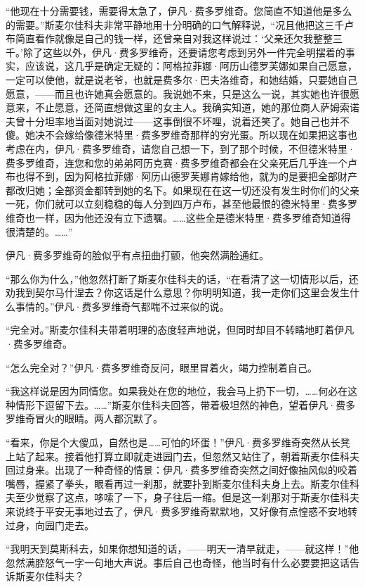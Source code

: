 \par “他现在十分需要钱，需要得太急了，伊凡·费多罗维奇。您简直不知道他是多么的需要。”斯麦尔佳科夫非常平静地用十分明确的口气解释说，“况且他把这三千卢布简直看作就像是自己的钱一样，还曾亲自对我这样说过：‘父亲还欠我整整三千。’除了这些以外，伊凡·费多罗维奇，还要请您考虑到另外一件完全明摆着的事实，应该说，这几乎是确定无疑的：阿格拉菲娜·阿历山德罗芙娜如果自己愿意，一定可以使他，就是说老爷，也就是费多尔·巴夫洛维奇，和她结婚，只要她自己愿意，——而且也许她真会愿意的。我说她不来，只是这么一说，其实她也许很愿意来，不止愿意，还简直想做这里的女主人。我确实知道，她的那位商人萨姆索诺夫曾十分坦率地当面对她说过——这事倒很不坏哩，说着还笑了。她自己也并不傻。她决不会嫁给像德米特里·费多罗维奇那样的穷光蛋。所以现在如果把这事也考虑在内，伊凡·费多罗维奇，请您自己想一下，到了那个时候，不但德米特里·费多罗维奇，连您和您的弟弟阿历克赛·费多罗维奇都会在父亲死后几乎连一个卢布也得不到，因为阿格拉菲娜·阿历山德罗芙娜肯嫁给他，就为的是要把全部财产都改归她；全部资金都转到她的名下。如果现在在这一切还没有发生时你们的父亲一死，你们就可以立刻稳稳的每人分到四万卢布，甚至他最恨的德米特里·费多罗维奇也一样，因为他还没有立下遗嘱。……这些全是德米特里·费多罗维奇知道得很清楚的。……”
\par 伊凡·费多罗维奇的脸似乎有点扭曲打颤，他突然满脸通红。
\par “那么你为什么，”他忽然打断了斯麦尔佳科夫的话，“在看清了这一切情形以后，还劝我到契尔马什涅去？你这话是什么意思？你明明知道，我一走你们这里会发生什么事情的。”伊凡·费多罗维奇气都喘不过来似的说。
\par “完全对。”斯麦尔佳科夫带着明理的态度轻声地说，但同时却目不转睛地盯着伊凡·费多罗维奇。
\par “怎么完全对？”伊凡·费多罗维奇反问，眼里冒着火，竭力控制着自己。
\par “我这样说是因为同情您。如果我处在您的地位，我会马上扔下一切，……何必在这种情形下逗留下去。……”斯麦尔佳科夫回答，带着极坦然的神色，望着伊凡·费多罗维奇冒火的眼睛。两人都沉默了。
\par “看来，你是个大傻瓜，自然也是……可怕的坏蛋！”伊凡·费多罗维奇突然从长凳上站了起来。接着他打算立即就走进园门去，但忽然又站住了，朝着斯麦尔佳科夫回过身来。出现了一种奇怪的情景：伊凡·费多罗维奇突然之间好像抽风似的咬着嘴唇，握紧了拳头，眼看再过一刹那，就要扑到斯麦尔佳科夫身上去。斯麦尔佳科夫至少觉察了这点，哆嗦了一下，身子往后一缩。但是这一刹那对于斯麦尔佳科夫来说终于平安无事地过去了，伊凡·费多罗维奇默默地，又好像有点惶惑不安地转过身，向园门走去。
\par “我明天到莫斯科去，如果你想知道的话，——明天一清早就走，——就这样！”他忽然满腔怒气一字一句地大声说。事后自己也奇怪，他当时有什么必要要把这话告诉斯麦尔佳科夫？
